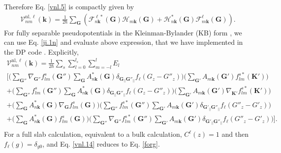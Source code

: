 Therefore Eq. \eqref{vnl.5} is compactly given by
\begin{align}\label{vnl.13}
\boldsymbol{\mathcal{V}}^{\mathrm{nl},\ell}_{nm}(\mathbf{k})=\frac{1}{2 \hbar}
\sum_{\mathbf{G}}
\left(
\mathcal{F}^{\ell*}_{n\mathbf{k}}(\mathbf{G}) 
\mathcal{H}_{m\mathbf{k}}(\mathbf{G}) 
+
\mathcal{H}^{*}_{n\mathbf{k}}(\mathbf{G}) 
\mathcal{F}^{\ell}_{m\mathbf{k}}(\mathbf{G}) 
\right)
.
\end{align} 
For fully  separable pseudopotentials in the Kleinman-Bylander (KB) form
\cite{mottaCMS10,kleinmanPRL82,adolphPRB96}, we can use Eq. \eqref{ji.1n} and
evaluate above expression, that we have implemented in the DP code
\cite{olevanoDP}. Explicitly,
\begin{align}\label{vnl.14}
\boldsymbol{\mathcal{V}}^{\mathrm{nl},\ell}_{nm}(\mathbf{k})=\frac{1}{2 \hbar}
\sum_s\sum_{l=0}^{l_s}\sum_{m=-l}^{l}E_l \nonumber\\
\Bigg[ \Bigg(\sum_{{\mathbf{G}''}}
\nabla_{{\mathbf{G}''}}f_{lm}^s({\mathbf{G}''})
\sum_{\mathbf{G}}A^{*}_{n{\mathbf{k}}}(\mathbf{G})\delta_{\mathbf{G}_{||}{\mathbf{G}''}_{||}}
f_\ell(G_z-G''_z) \Bigg)  
\Bigg( \sum_{{\mathbf{G}'}}A_{m{\mathbf{k}}}({\mathbf{G}'})f_{lm}^{s*}({\mathbf{K}'}) \Bigg) \nonumber\\
%
+ \Bigg(\sum_{{\mathbf{G}''}}
f_{lm}^s({\mathbf{G}''})\sum_{\mathbf{G}}A^{*}_{n{\mathbf{k}}}(\mathbf{G})\delta_{\mathbf{G}_{||}{\mathbf{G}''}_{||}}
f_\ell(G_z-G''_z) \Bigg)  
\Bigg( \sum_{{\mathbf{G}'}}A_{m{\mathbf{k}}}({\mathbf{G}'})\nabla_{{\mathbf{K}'}}f_{lm}^{s*}({\mathbf{K}'}) \Bigg)  \nonumber\\
+
\Bigg(\sum_{\mathbf{G}}A^{*}_{n{\mathbf{k}}}(\mathbf{G})\nabla_{\mathbf{G}}f_{lm}^s(\mathbf{G})\Bigg)\Bigg(
\sum_{{\mathbf{G}''}}
f_{lm}^{s*}({\mathbf{G}''})\sum_{{\mathbf{G}'}}A_{m{\mathbf{k}}}({\mathbf{G}'})\delta_{{\mathbf{G}'}_{||}{\mathbf{G}''}_{||}}
f_\ell(G''_z-G'_z) \Bigg) \nonumber\\ 
+
\Bigg(\sum_{\mathbf{G}}A^{*}_{n{\mathbf{k}}}(\mathbf{G})f_{lm}^s(\mathbf{G})
\Bigg) \Bigg(
\sum_{{\mathbf{G}''}}\nabla_{{\mathbf{G}''}}f_{lm}^{s*}({\mathbf{G}''})
\sum_{{\mathbf{G}'}}A_{m{\mathbf{k}}}({\mathbf{G}'})\delta_{{\mathbf{G}'}_{||}{\mathbf{G}''}_{||}}
f_\ell(G''_z-G'_z) \Bigg) \Bigg].\nonumber\\ 
\end{align} 
For a full slab calculation, equivalent to a bulk calculation,
$C^{\ell}(z)=1$ and then 
$f_\ell(g) =\delta_{g0}$, and Eq. \eqref{vnl.14}
reduces to 
Eq. \eqref{forg}. 



